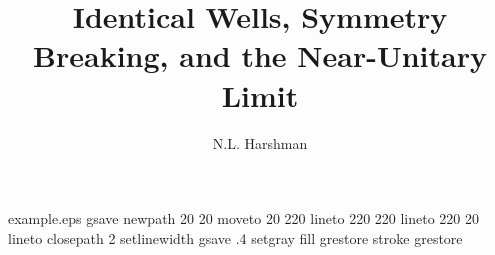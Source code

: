 %
%
%
%
%
\begin{filecontents*}{example.eps}
gsave
newpath
  20 20 moveto
  20 220 lineto
  220 220 lineto
  220 20 lineto
closepath
2 setlinewidth
gsave
  .4 setgray fill
grestore
stroke
grestore
\end{filecontents*}
%
\documentclass[onecollarge,natbib]{svjour2}
%
\smartqed  %
%
\usepackage{amsmath,revsymb,graphicx,amssymb,array}
%
%
%
\newcommand{\kt}[1]{\ensuremath{|#1\rangle}}
\newcommand{\br}[1]{\ensuremath{\langle#1|}}
\newcommand{\bk}[2]{\ensuremath{\langle #1|#2\rangle}}
%
%


\title{Identical Wells, Symmetry Breaking, and the Near-Unitary Limit%
}


\author{N.L. Harshman
}



